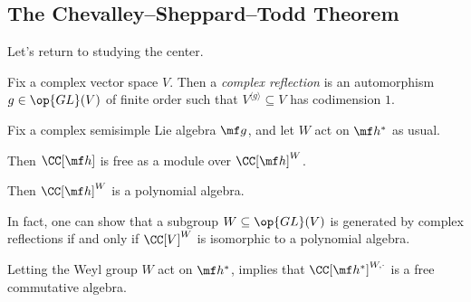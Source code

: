 \documentclass[../notes.tex]{subfiles}
\begin{document}
\subsection{The Chevalley--Sheppard--Todd Theorem}
Let's return to studying the center.
\begin{definition}
	Fix a complex vector space $V$. Then a \textit{complex reflection} is an automorphism $g\in\op{GL}(V)$ of finite order such that $V^{\langle g\rangle}\subseteq V$ has codimension $1$.
\end{definition}
\begin{theorem} \label{thm:easy-cst}
	Fix a complex semisimple Lie algebra $\mf g$, and let $W$ act on $\mf h^*$ as usual. %
	\begin{listalph}
		\item Then $\CC[\mf h]$ is free as a module over $\CC[\mf h]^W$.
		\item Then $\CC[\mf h]^W$ is a polynomial algebra.
	\end{listalph}
\end{theorem}
\begin{remark}
	In fact, one can show that a subgroup $W\subseteq\op{GL}(V)$ is generated by complex reflections if and only if $\CC[V]^W$ is isomorphic to a polynomial algebra.
\end{remark}
\begin{example}
	Letting the Weyl group $W$ act on $\mf h^*$,  implies that $\CC[\mf h^*]^{W,\cdot}$ is a free commutative algebra.
\end{example}
\end{document}
